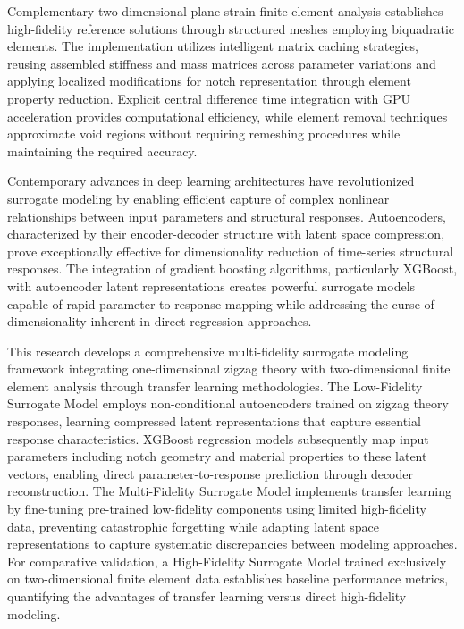 \documentclass[12pt,a4paper]{report}
\begin{document}
Complementary two-dimensional plane strain finite element analysis establishes high-fidelity reference solutions through structured meshes employing biquadratic elements. The implementation utilizes intelligent matrix caching strategies, reusing assembled stiffness and mass matrices across parameter variations and applying localized modifications for notch representation through element property reduction. Explicit central difference time integration with GPU acceleration provides computational efficiency, while element removal techniques approximate void regions without requiring remeshing procedures while maintaining the required accuracy.

Contemporary advances in deep learning architectures have revolutionized surrogate modeling by enabling efficient capture of complex nonlinear relationships between input parameters and structural responses. Autoencoders, characterized by their encoder-decoder structure with latent space compression, prove exceptionally effective for dimensionality reduction of time-series structural responses. The integration of gradient boosting algorithms, particularly XGBoost, with autoencoder latent representations creates powerful surrogate models capable of rapid parameter-to-response mapping while addressing the curse of dimensionality inherent in direct regression approaches.

This research develops a comprehensive multi-fidelity surrogate modeling framework integrating one-dimensional zigzag theory with two-dimensional finite element analysis through transfer learning methodologies. The Low-Fidelity Surrogate Model employs non-conditional autoencoders trained on zigzag theory responses, learning compressed latent representations that capture essential response characteristics. XGBoost regression models subsequently map input parameters including notch geometry and material properties to these latent vectors, enabling direct parameter-to-response prediction through decoder reconstruction. The Multi-Fidelity Surrogate Model implements transfer learning by fine-tuning pre-trained low-fidelity components using limited high-fidelity data, preventing catastrophic forgetting while adapting latent space representations to capture systematic discrepancies between modeling approaches. For comparative validation, a High-Fidelity Surrogate Model trained exclusively on two-dimensional finite element data establishes baseline performance metrics, quantifying the advantages of transfer learning versus direct high-fidelity modeling.
\end{document}
